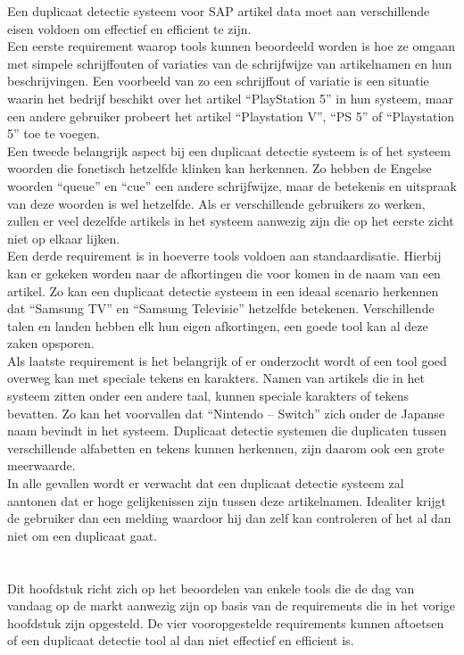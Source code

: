 Een duplicaat detectie systeem voor SAP artikel data moet aan verschillende eisen voldoen om effectief en efficient te zijn.
\\Een eerste requirement waarop tools kunnen beoordeeld worden is hoe ze omgaan met simpele schrijffouten of variaties van de schrijfwijze van artikelnamen en hun beschrijvingen. Een voorbeeld van zo een schrijffout of variatie is een situatie waarin het bedrijf beschikt over het artikel “PlayStation 5” in hun systeem, maar een andere gebruiker probeert het artikel “Playstation V”, “PS 5” of “Playstation 5”  toe te voegen.
\\Een tweede belangrijk aspect bij een duplicaat detectie systeem is of het systeem woorden die fonetisch hetzelfde klinken kan herkennen. Zo hebben de Engelse woorden “queue” en “cue” een andere schrijfwijze, maar de betekenis en uitspraak van deze woorden is wel hetzelfde. Als er verschillende gebruikers zo werken, zullen er veel dezelfde artikels in het systeem aanwezig zijn die op het eerste zicht niet op elkaar lijken.
\\Een derde requirement is in hoeverre tools voldoen aan standaardisatie. Hierbij kan er gekeken worden naar de afkortingen die voor komen in de naam van een artikel. Zo kan een duplicaat detectie systeem in een ideaal scenario herkennen dat “Samsung TV” en “Samsung Televisie” hetzelfde betekenen. Verschillende talen en landen hebben elk hun eigen afkortingen, een goede tool kan al deze zaken opsporen.
\\Als laatste requirement is het belangrijk of er onderzocht wordt of een tool goed overweg kan met speciale tekens en karakters. Namen van artikels die in het systeem zitten onder een andere taal, kunnen speciale karakters of tekens bevatten. Zo kan het voorvallen dat “Nintendo – Switch” zich onder de Japanse naam bevindt in het systeem. Duplicaat detectie systemen die duplicaten tussen verschillende alfabetten en tekens kunnen herkennen, zijn daarom ook een grote meerwaarde. 
\\In alle gevallen wordt er verwacht dat een duplicaat detectie systeem zal aantonen dat er hoge gelijkenissen zijn tussen deze artikelnamen. Idealiter krijgt de gebruiker dan een melding waardoor hij dan zelf kan controleren of het al dan niet om een duplicaat gaat.

\section{}%
\label{sec:tools}
Dit hoofdstuk richt zich op het beoordelen van enkele tools die de dag van vandaag op de markt aanwezig zijn op basis van de requirements die in het vorige hoofdstuk zijn opgesteld. De vier vooropgestelde requirements kunnen aftoetsen of een duplicaat detectie tool al dan niet effectief en efficient is.

